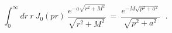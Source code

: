 \begin{equation}
\int _{0}^{\infty} dr~r~J_{0}(pr)~\frac { e^{-a \sqrt {r^2 + M^2} } }
{\sqrt {r^2 + M^2}} ~=~ \frac { e^{-M \sqrt {p^2 + a^2} } }
{\sqrt {p^2 + a^2}} ~~~.
\end{equation}

